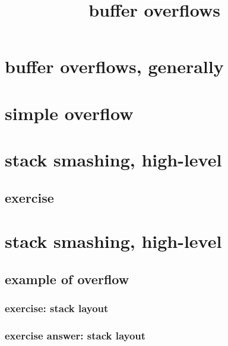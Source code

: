 \graphicspath{{./figures/}}
\title{buffer overflows}
\date{}

\begin{frame}
    \titlepage
\end{frame}


\usetikzlibrary{arrows.meta}


\section{buffer overflows, generally}


\section{simple overflow}


\section{stack smashing, high-level}


\subsection{exercise}


\section{stack smashing, high-level}


\subsection{example of overflow}


\subsubsection{exercise: stack layout}


\subsubsection{exercise answer: stack layout}


